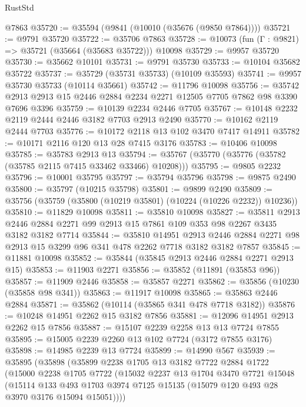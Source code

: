 \begin{lexlean}{RustStd}
\begin{coremodule}
    @7863
@35720 := @35594 (@9841 (@10010 (@35676 (@9850 @7864))))
@35721 := @9791 @35720
@35722 := @35706 @7863
@35728 := @10073 (fun (Γ : @9821) => @35721 (@35664 (@35683 @35722))) @10098
@35729 := @9957 @35720
@35730 := @35662 @10101
@35731 := @9791 @35730
@35733 := @10104 @35682 @35722
@35737 := @35729 (@35731 @35733) (@10109 @35593)
@35741 := @9957 @35730 @35733 (@10114 @35661)
@35742 := @11796 @10098
@35756 := @35742 @2913 @2913 @15 @2446 @2884 @2234 @2271 @12505 @7705 @7862 @98 @3390 @7696 @3396
@35759 := @10139 @2234 @2446 @7705
@35767 := @10148 @2232 @2119 @2444 @2446 @3182 @7703 @2913 @2490
@35770 := @10162 @2119 @2444 @7703
@35776 := @10172 @2118 @13 @102 @3470 @7417 @14911
@35782 := @10171 @2116 @120 @13 @28 @7415 @3176
@35783 := @10406 @10098
@35785 := @35783 @2913 @13
@35794 := @35767 (@35770 (@35776 (@35782 (@35785 @2115 @7415 @33462 @33466) @10208)))
@35795 := @9805 @2232
@35796 := @10001 @35795
@35797 := @35794 @35796
@35798 := @9875 @2490
@35800 := @35797 (@10215 @35798)
@35801 := @9899 @2490
@35809 := @35756 (@35759 (@35800 (@10219 @35801) (@10224 (@10226 @2232)) @10236))
@35810 := @11829 @10098
@35811 := @35810 @10098
@35827 := @35811
    @2913
    @2446
    @2884
    @2271
    @99
    @2913
    @15
    @7861
    @109
    @353
    @98
    @2267
    @3435
    @3182
    @3182
    @7714
@35844 := @35810
    @14951
    @2913
    @2446
    @2884
    @2271
    @98
    @2913
    @15
    @3299
    @96
    @341
    @478
    @2262
    @7718
    @3182
    @3182
    @7857
@35845 := @11881 @10098
@35852 := @35844 (@35845 @2913 @2446 @2884 @2271 @2913 @15)
@35853 := @11903 @2271
@35856 := @35852 (@11891 (@35853 @96))
@35857 := @11909 @2446
@35858 := @35857 @2271
@35862 := @35856 (@10230 (@35858 @98 @341))
@35863 := @11917 @10098
@35865 := @35863 @2446 @2884
@35871 := @35862 (@10114 (@35865 @341 @478 @7718 @3182))
@35876 := @10248 @14951 @2262 @15 @3182 @7856
@35881 := @12096 @14951 @2913 @2262 @15 @7856
@35887 := @15107 @2239 @2258 @13 @13 @7724 @7855
@35895 := @15005 @2239 @2260 @13 @102 @7724 (@3172 @7855 @3176)
@35898 := @14985 @2239 @13 @7724
@35899 := @14990 @567
@35939 := @35895
    (@35898
      (@35899
        @2238
        @1705
        @13
        @3182
        @7722
        @2884
        @1722
        (@15000
          @2238
          @1705
          @7722
          (@15032
            @2237
            @13
            @1704
            @3470
            @7721
            @15048
            (@15114
              @133
              @493
              @1703
              @3974
              @7125
              @15135
              (@15079 @120 @493 @28 @3970 @3176 @15094 @15051))))

\end{coremodule}
\end{lexlean}
